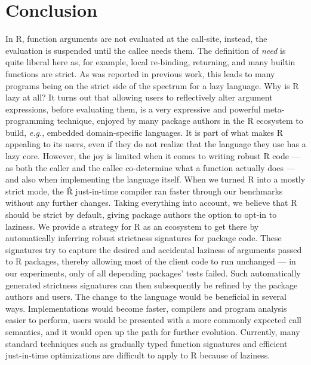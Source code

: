 \documentclass[review,screen,acmsmall]{acmart}
\renewcommand{\Rsh}{{\sf\v R}\xspace}
\newcommand{\eg}{\emph{e.g.},\xspace}
\begin{document}
\section{Conclusion}\label{sec:conclusion}

In R, function arguments are not evaluated at the call-site, instead, the
evaluation is suspended until the callee needs them. The definition of
\emph{need} is quite liberal here as, for example, local re-binding, returning,
and many builtin functions are strict. As was reported in previous work, this
leads to many programs being on the strict side of the spectrum for a lazy
language. Why is R lazy at all? It turns out that allowing users to reflectively
alter argument expressions, before evaluating them, is a very expressive and
powerful meta-programming technique, enjoyed by many package authors in the R
ecosystem to build, \eg embedded domain-specific languages. It is part of what
makes R appealing to its users, even if they do not realize that the language
they use has a lazy core. However, the joy is limited when it comes to writing
robust R code --- as both the caller and the callee co-determine what a function
actually does --- and also when implementing the language itself. When we turned
R into a mostly strict mode, the \Rsh just-in-time compiler ran
\speedupRshStrict faster through our benchmarks without any further changes.
Taking everything into account, we believe that R should be strict by default,
giving package authors the option to opt-in to laziness. We provide a strategy
for R as an ecosystem to get there by automatically inferring robust strictness
signatures for package code. These signatures try to capture the desired and
accidental laziness of arguments passed to R packages, thereby allowing most of
the client code to run unchanged --- in our experiments, only
\ValidationStrictFailedProgramPerc of all depending packages' tests failed. Such
automatically generated strictness signatures can then subsequently be refined
by the package authors and users. The change to the language would be beneficial
in several ways. Implementations would become faster, compilers and program
analysis easier to perform, users would be presented with a more commonly
expected call semantics, and it would open up the path for further evolution.
Currently, many standard techniques such as gradually typed function signatures
and efficient just-in-time optimizations are difficult to apply to R because of
laziness.


\end{document}
